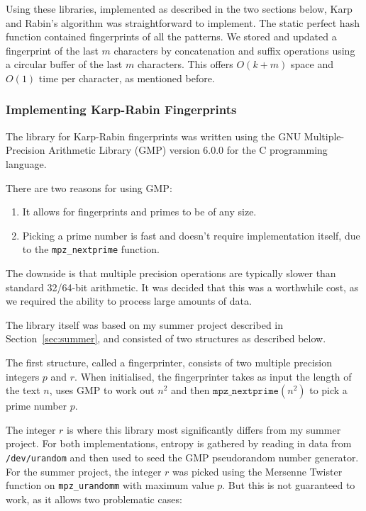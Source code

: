 \documentclass[ %
                    author={Dominic Joseph Moylett},
                    degree={MEng},
                     title={Dictionary Matching with Fingerprints},
                  subtitle={An Empirical Analysis},
                      type={research},
                      year={2015} ]{dissertation}
\begin{document}
Using these libraries, implemented as described in the two sections below, Karp and Rabin's algorithm was straightforward to implement. The static perfect hash function contained fingerprints of all the patterns. We stored and updated a fingerprint of the last $m$ characters by concatenation and suffix operations using a circular buffer of the last $m$ characters. This offers $O(k + m)$ space and $O(1)$ time per character, as mentioned before.

\subsubsection{Implementing Karp-Rabin Fingerprints}
\label{sssec:kr-implementation}

The library for Karp-Rabin fingerprints was written using the GNU Multiple-Precision Arithmetic Library (GMP) version 6.0.0 for the C programming language.

There are two reasons for using GMP:
\begin{enumerate}
  \item It allows for fingerprints and primes to be of any size.
  \item Picking a prime number is fast and doesn't require implementation itself, due to the \texttt{mpz\_nextprime} function.
\end{enumerate}

The downside is that multiple precision operations are typically slower than standard 32/64-bit arithmetic. It was decided that this was a worthwhile cost, as we required the ability to process large amounts of data.

The library itself was based on my summer project described in Section~\ref{sec:summer}, and consisted of two structures as described below.

The first structure, called a fingerprinter, consists of two multiple precision integers $p$ and $r$. When initialised, the fingerprinter takes as input the length of the text $n$, uses GMP to work out $n^2$ and then $\texttt{mpz\_nextprime}(n^2)$ to pick a prime number $p$.

The integer $r$ is where this library most significantly differs from my summer project. For both implementations, entropy is gathered by reading in data from \texttt{/dev/urandom} and then used to seed the GMP pseudorandom number generator. For the summer project, the integer $r$ was picked using the Mersenne Twister function on \texttt{mpz\_urandomm} with maximum value $p$. But this is not guaranteed to work, as it allows two problematic cases:
\end{document}
